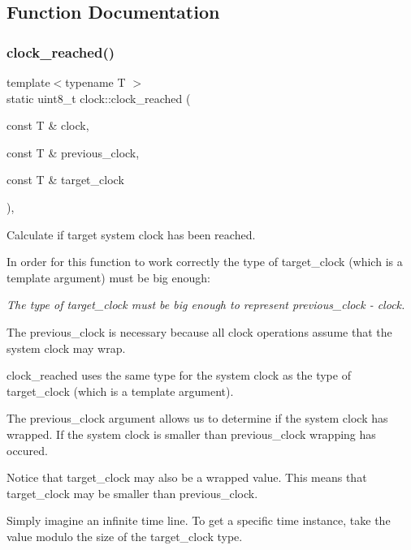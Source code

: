 \subsection{Function Documentation}
\hypertarget{namespaceclock_a107ad02a77763be28bf63d43c566cf75}{}\label{namespaceclock_a107ad02a77763be28bf63d43c566cf75} 
\subsubsection{\texorpdfstring{clock\+\_\+reached()}{clock\_reached()}\hspace{0.1cm}{\footnotesize\ttfamily [1/3]}}
{\footnotesize\ttfamily template$<$typename T $>$ \\
static uint8\+\_\+t clock\+::clock\+\_\+reached (\begin{DoxyParamCaption}\item[{const T \&}]{clock,  }\item[{const T \&}]{previous\+\_\+clock,  }\item[{const T \&}]{target\+\_\+clock }\end{DoxyParamCaption})\hspace{0.3cm}{\ttfamily [inline]}, {\ttfamily [static]}}



Calculate if target system clock has been reached. 

In order for this function to work correctly the type of target\+\_\+clock (which is a template argument) must be big enough\+:

{\itshape The type of target\+\_\+clock must be big enough to represent {\ttfamily previous\+\_\+clock -\/ clock}.}

The previous\+\_\+clock is necessary because all clock operations assume that the system clock may wrap.

clock\+\_\+reached uses the same type for the system clock as the type of target\+\_\+clock (which is a template argument).

The previous\+\_\+clock argument allows us to determine if the system clock has wrapped. If the system clock is smaller than previous\+\_\+clock wrapping has occured.

Notice that target\+\_\+clock may also be a wrapped value. This means that target\+\_\+clock may be smaller than previous\+\_\+clock.

Simply imagine an infinite time line. To get a specific time instance, take the value modulo the size of the target\+\_\+clock type.

